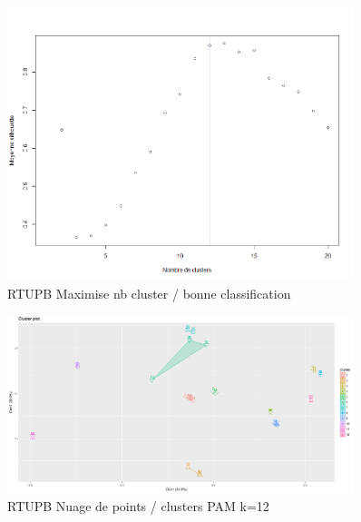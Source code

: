 %
%

\begin{figure}[H]
\centering
\includegraphics[width=0.90\textwidth]{../Fig/RTUPB/rtupb-elbow-pre.png}
\caption{RTUPB Maximise nb cluster / bonne classification}
\end{figure}

\begin{figure}[H]
\centering
\includegraphics[width=0.90\textwidth]{../Fig/RTUPB/rtupb-pam-k12.png}
\caption{RTUPB Nuage de points / clusters PAM k=12 }
\end{figure}

